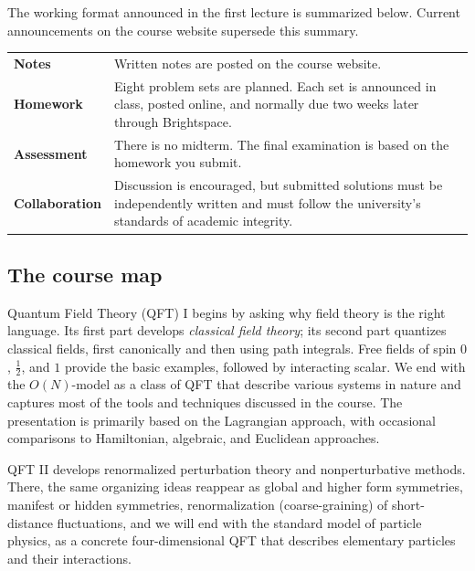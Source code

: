 \documentclass[11pt]{article}
\begin{document}
The working format announced in the first lecture is summarized below.  Current announcements on the course website supersede this summary.
\begin{center}
\begin{tabular}{>{\bfseries}p{} p{}}
Notes & Written notes are posted on the course website.\\
Homework & Eight problem sets are planned.  Each set is announced in class, posted online, and normally due two weeks later through Brightspace. \\
Assessment & There is no midterm.  The final examination is based on the homework you submit.\\
Collaboration & Discussion is encouraged, but submitted solutions must be independently written and must follow the university's standards of academic integrity. \\
\end{tabular}
\end{center}
\subsection*{The course map}

Quantum Field Theory (QFT) I begins by asking why field theory is the right language.  Its first part develops \emph{classical field theory}; its second part quantizes classical fields, first canonically and then using path integrals.  Free fields of spin $0$, $\tfrac12$, and $1$ provide the basic examples, followed by interacting scalar. We end with the $O(N)$-model as a class of QFT that describe various systems in nature and captures most of the tools and techniques discussed in the course.  The presentation is primarily based on the Lagrangian approach, with occasional comparisons to Hamiltonian, algebraic, and Euclidean approaches.

QFT II develops renormalized perturbation theory and nonperturbative methods.  There, the same organizing ideas reappear as global and higher form symmetries, manifest or hidden symmetries, renormalization (coarse-graining) of short-distance fluctuations, and we will end with the standard model of particle physics, as a concrete four-dimensional QFT that describes elementary particles and their interactions.
\end{document}
